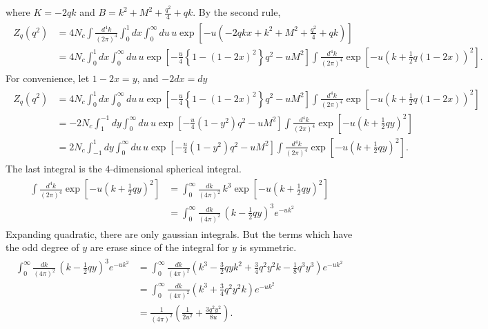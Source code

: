 \documentclass[tightenlines,floatfix,nofootinbib,superscriptaddress,fleqn]{revtex4-2}
\begin{document}
where $K = -2qk$ and $B = k^2+M^2+\frac{q^2}{4}+qk$. By the second rule,
\begin{align}
  \begin{split}
    Z_q(q^2)
    &= 4N_c\int\frac{d^4k}{(2\pi)^4}
    \int^1_0dx
    \int^\infty_0du\,u\exp\left[-u\left(-2qkx
    +k^2+M^2+\frac{q^2}{4}+qk\right)\right]  \\
    &= 4N_c
    \int^1_0dx
    \int^\infty_0du\,u
    \exp\left[-\frac{u}{4}\left\{
      1-(1-2x)^2
    \right\}q^2-uM^2\right]
    \int\frac{d^4k}{(2\pi)^4}
    \exp\left[-u\left(k+\frac{1}{2}q(1-2x)\right)^2\right].
  \end{split}
\end{align}
For convenience, let $1-2x=y$,  and $-2dx=dy$
\begin{align}
  \begin{split}
    Z_q(q^2)
    &= 4N_c
    \int^1_0dx
    \int^\infty_0du\,u
    \exp\left[-\frac{u}{4}\left\{
      1-(1-2x)^2
    \right\}q^2-uM^2\right]
    \int\frac{d^4k}{(2\pi)^4}
    \exp\left[-u\left(k+\frac{1}{2}q(1-2x)\right)^2\right]  \\
    &=-2N_c
    \int^{-1}_1dy
    \int^\infty_0du\,u
    \exp\left[-\frac{u}{4}\left(
      1-y^2
      \right)q^2-uM^2\right]
      \int\frac{d^4k}{(2\pi)^4}
      \exp\left[-u\left(k+\frac{1}{2}qy\right)^2\right] \\
    &= 2N_c
    \int_{-1}^1dy
    \int^\infty_0du\,u
    \exp\left[-\frac{u}{4}\left(
      1-y^2
      \right)q^2-uM^2\right]
      \int\frac{d^4k}{(2\pi)^4}
      \exp\left[-u\left(k+\frac{1}{2}qy\right)^2\right].
  \end{split}
\end{align}
The last integral is the 4-dimensional spherical integral.
\begin{align}
  \begin{split}
    \int\frac{d^4k}{(2\pi)^4}
      \exp\left[-u\left(k+\frac{1}{2}qy\right)^2\right]
      &=\int^\infty_0\frac{dk}{(4\pi)^2}\,
      k^3\exp\left[-u\left(k+\frac{1}{2}qy\right)^2\right]  \\
      &=\int^\infty_0\frac{dk}{(4\pi)^2}\,
      \left(k-\frac{1}{2}qy\right)^3e^{-uk^2}
  \end{split}
\end{align}
Expanding quadratic, there are only gaussian integrals. But
the terms which have the odd degree of $y$ are erase since of
the integral for $y$ is symmetric.
\begin{align}
  \begin{split}
    \int^\infty_0\frac{dk}{(4\pi)^2}\,
    \left(k-\frac{1}{2}qy\right)^3e^{-uk^2}
    &=\int^\infty_0\frac{dk}{(4\pi)^2}\left(
    k^3-\frac{3}{2}qyk^2+\frac{3}{4}q^2y^2k-\frac{1}{8}q^3y^3
    \right)e^{-uk^2}\\
    &=\int^\infty_0\frac{dk}{(4\pi)^2}\left(
    k^3+\frac{3}{4}q^2y^2k
    \right)e^{-uk^2}  \\
    & =\frac{1}{(4\pi)^2}\left(\frac{1}{2u^2}+\frac{3q^2y^2}{8u}\right).
  \end{split}
\end{align}
\end{document}
